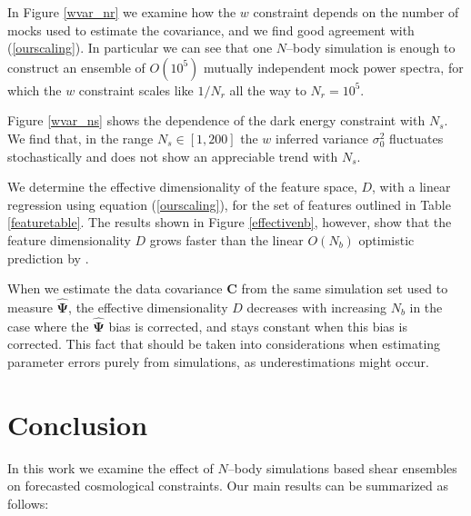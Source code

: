 \documentclass[reprint,aps,prd,superscriptaddress,showkeys,showpacs]{revtex4-1}
\newcommand{\bb}[1]{\mathbf{#1}}
\newcommand{\bbh}[1]{\mathbf{\hat{#1}}}
\begin{document}
In Figure \ref{wvar_nr} we examine how the $w$ constraint depends on the number of mocks used to estimate the covariance, and we find good agreement with (\ref{ourscaling}). In particular we can see that one $N$--body simulation is enough to construct an ensemble of $O(10^5)$ mutually independent mock power spectra, for which the $w$ constraint scales like $1/N_r$ all the way to $N_r=10^5$.    

Figure \ref{wvar_ns} shows the dependence of the dark energy constraint with $N_s$. We find that, in the range $N_s\in[1,200]$ the $w$ inferred variance $\sigma_0^2$ fluctuates stochastically and does not show an appreciable trend with $N_s$. 

We determine the effective dimensionality of the feature space, $D$, with a linear regression using equation (\ref{ourscaling}), for the set of features outlined in Table \ref{featuretable}. The results shown in Figure \ref{effectivenb}, however, show that the feature dimensionality $D$ grows faster than the linear $O(N_b)$ optimistic prediction by \citep{DodelsonSchneider13}. 

When we estimate the data covariance $\bb{C}$ from the same simulation set used to measure $\bbh{\Psi}$, the effective dimensionality $D$ decreases with increasing $N_b$ in the case where the $\bbh{\Psi}$ bias is corrected, and stays constant when this bias is corrected. This fact that should be taken into considerations when estimating parameter errors purely from simulations, as underestimations might occur. 


\section{Conclusion}

In this work we examine the effect of $N$--body simulations based shear ensembles on forecasted cosmological constraints. Our main results can be summarized as follows:
\end{document}
